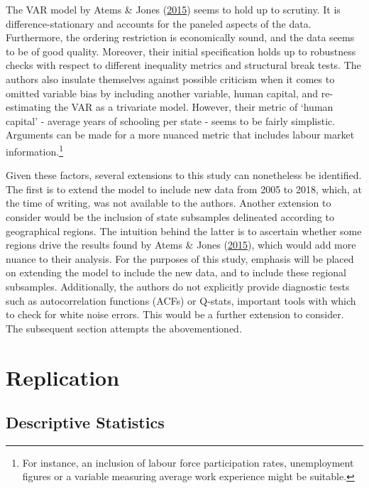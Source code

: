 \documentclass[11pt,preprint, authoryear]{elsarticle}
\numberwithin{equation}{section}
\numberwithin{figure}{section}
\numberwithin{table}{section}
\let\rmarkdownfootnote\footnote%
\def\footnote{\protect\rmarkdownfootnote}
\begin{document}
The VAR model by Atems \& Jones (\protect\hyperlink{ref-atems}{2015})
seems to hold up to scrutiny. It is difference-stationary and accounts
for the paneled aspects of the data. Furthermore, the ordering
restriction is economically sound, and the data seems to be of good
quality. Moreover, their initial specification holds up to robustness
checks with respect to different inequality metrics and structural break
tests. The authors also insulate themselves against possible criticism
when it comes to omitted variable bias by including another variable,
human capital, and re-estimating the VAR as a trivariate model. However,
their metric of `human capital' - average years of schooling per state -
seems to be fairly simplistic. Arguments can be made for a more nuanced
metric that includes labour market information.\footnote{For instance,
  an inclusion of labour force participation rates, unemployment figures
  or a variable measuring average work experience might be suitable.}

Given these factors, several extensions to this study can nonetheless be
identified. The first is to extend the model to include new data from
2005 to 2018, which, at the time of writing, was not available to the
authors. Another extension to consider would be the inclusion of state
subsamples delineated according to geographical regions. The intuition
behind the latter is to ascertain whether some regions drive the results
found by Atems \& Jones (\protect\hyperlink{ref-atems}{2015}), which
would add more nuance to their analysis. For the purposes of this study,
emphasis will be placed on extending the model to include the new data,
and to include these regional subsamples. Additionally, the authors do
not explicitly provide diagnostic tests such as autocorrelation
functions (ACFs) or Q-stats, important tools with which to check for
white noise errors. This would be a further extension to consider. The
subsequent section attempts the abovementioned.

\newpage

\hypertarget{replication}{%
\section{\texorpdfstring{Replication
\label{Section 3}}{Replication }}\label{replication}}

\hypertarget{descriptive-statistics}{%
\subsection{\texorpdfstring{Descriptive Statistics
\label{Section 3.1}}{Descriptive Statistics }}\label{descriptive-statistics}}
\end{document}
